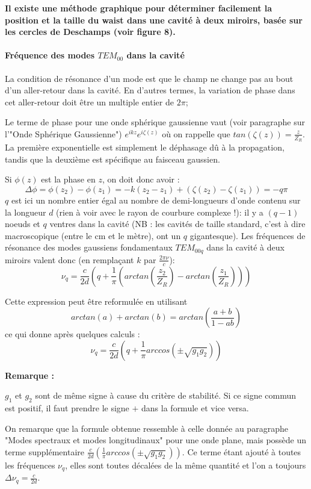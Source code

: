 \documentclass{book}
\begin{document}
\textbf{\color{red}Il existe une méthode graphique pour déterminer facilement la position et la taille du waist dans une cavité à deux miroirs, basée sur les cercles de Deschamps (voir figure 8).}

\paragraph{Fréquence des modes \(TEM_{00}\) dans la cavité}

La condition de résonance d'un mode est que le champ ne change pas au bout d'un aller-retour dans la cavité. En d'autres termes, la variation de phase dans cet aller-retour doit être un multiple entier de \(2\pi\);

Le terme de phase pour une onde sphérique gaussienne vaut (voir paragraphe sur l'"Onde Sphérique Gaussienne") \(e^{ikz}e^{i\zeta (z)}\) où on rappelle que \(tan(\zeta (z)) = \frac z {Z_R}\). La première exponentielle est simplement le déphasage dû à la propagation, tandis que la deuxième est spécifique au faisceau gaussien.

Si \(\phi (z)\) est la phase en \(z\), on doit donc avoir :
\[\Delta \phi = \phi (z_2) - \phi(z_1)=-k(z_2-z_1)+(\zeta(z_2)- \zeta(z_1))=-q\pi\]
\(q\) est ici un nombre entier égal au nombre de demi-longueurs d'onde contenu sur la longueur \(d\) (rien à voir avec le rayon de courbure complexe !): il y a \((q-1)\) noeuds et \(q\) ventres dans la cavité (NB : les cavités de taille standard, c'est à dire macroscopique (entre le cm et le mètre), ont un \(q\) gigantesque). Les fréquences de résonance des modes gaussiens fondamentaux \(TEM_{00q}\) dans la cavité à deux miroirs valent donc (en remplaçant \(k\) par \(\frac {2\pi \nu}c\)):
\[\nu_q=\frac c{2d}\left(q+\frac
1\pi\left(arctan\left(\frac{z_2}{Z_R}\right)-arctan\left(\frac{z_1}{Z_R}\right)\right)\right)\]

Cette expression peut être reformulée en utilisant
\[arctan(a)+arctan(b) = arctan\left(\frac{a+b}{1-ab}\right)\]
ce qui donne après quelques calculs :
\[\nu_q=\frac c{2d}\left(q+\frac 1\pi arccos(\pm\sqrt{g_1g_2})\right)\]

\textbf{\color{remarque1}Remarque :}  
\begin{mdframed}[linecolor=remarque1, backgroundcolor=remarque2]

\(g_1\) et \(g_2\) sont de même signe à cause du critère de stabilité. Si ce signe commun est positif, il faut prendre le signe \(+\) dans la formule et vice versa.

\end{mdframed}
On remarque que la formule obtenue ressemble à celle donnée au paragraphe "Modes spectraux et modes longitudinaux" pour une onde plane, mais possède un terme supplémentaire \(\frac c{2d}\left(\frac 1\pi arccos(\pm\sqrt{g_1g_2})\right)\). Ce terme étant ajouté à toutes les fréquences \(\nu_q\), elles sont toutes décalées de la même quantité et l'on a toujours \(\Delta \nu_q=\frac c{2d}\).
\end{document}
